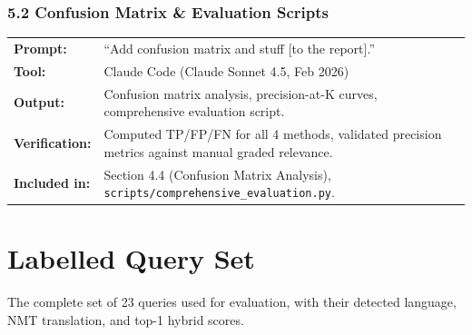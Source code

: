 \documentclass[12pt,a4paper]{article}
\begin{document}
\subsubsection*{5.2 Confusion Matrix \& Evaluation Scripts}
\begin{tabular}{p{3.2cm}p{9.5cm}}
\textbf{Prompt:}        & ``Add confusion matrix and stuff [to the report].'' \\
\textbf{Tool:}          & Claude Code (Claude Sonnet 4.5, Feb 2026) \\
\textbf{Output:}        & Confusion matrix analysis, precision-at-K curves, comprehensive evaluation script. \\
\textbf{Verification:}  & Computed TP/FP/FN for all 4 methods, validated precision metrics against manual graded relevance. \\
\textbf{Included in:}   & Section 4.4 (Confusion Matrix Analysis), \texttt{scripts/comprehensive\_evaluation.py}. \\
\end{tabular}


\section{Labelled Query Set}
\label{appendix:queries}

The complete set of 23 queries used for evaluation, with their detected language, NMT translation, and top-1 hybrid scores.
\end{document}

